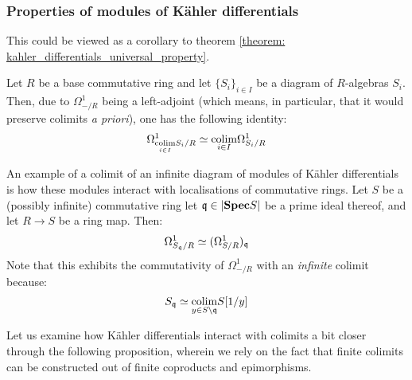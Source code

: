             \subsubsection{Properties of modules of K\"ahler differentials} \label{subsubsection: properties_of_kahler_differentials}
                \begin{remark} \label{remark: differentials_and_colimits}
                    This could be viewed as a corollary to theorem \ref{theorem: kahler_differentials_universal_property}. 
                    
                    Let $R$ be a base commutative ring and let $\{S_i\}_{i \in I}$ be a diagram of $R$-algebras $S_i$. Then, due to $\Omega^1_{-/R}$ being a left-adjoint (which means, in particular, that it would preserve colimits \textit{a priori}), one has the following identity:
                        $$\Omega^1_{\underset{i \in I}{\operatorname{colim}} S_i/R} \simeq \underset{i \in I}{\operatorname{colim}} \Omega^1_{S_i/R}$$
                \end{remark}
                \begin{example} \label{example: differentials_and_localisations}
                    An example of a colimit of an infinite diagram of modules of K\"ahler differentials is how these modules interact with localisations of commutative rings. Let $S$ be a (possibly infinite) commutative ring let $\mathfrak{q} \in |\mathbf{Spec} S|$ be a prime ideal thereof, and let $R \to S$ be a ring map. Then:
                        $$\Omega^1_{S_{\mathfrak{q}}/R} \simeq (\Omega^1_{S/R})_{\mathfrak{q}}$$
                    Note that this exhibits the commutativity of $\Omega^1_{-/R}$ with an \textit{infinite} colimit because:
                        $$S_{\mathfrak{q}} \simeq \underset{y \in S \setminus \mathfrak{q}}{\operatorname{colim}} S[1/y]$$
                \end{example}
                Let us examine how K\"ahler differentials interact with colimits a bit closer through the following proposition, wherein we rely on the fact that finite colimits can be constructed out of finite coproducts and epimorphisms.
